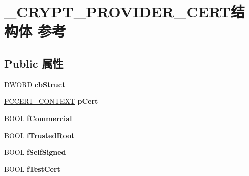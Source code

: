 \hypertarget{struct___c_r_y_p_t___p_r_o_v_i_d_e_r___c_e_r_t}{}\section{\+\_\+\+C\+R\+Y\+P\+T\+\_\+\+P\+R\+O\+V\+I\+D\+E\+R\+\_\+\+C\+E\+R\+T结构体 参考}
\label{struct___c_r_y_p_t___p_r_o_v_i_d_e_r___c_e_r_t}
\subsection*{Public 属性}
\begin{DoxyCompactItemize}
\item 
\mbox{\label{struct___c_r_y_p_t___p_r_o_v_i_d_e_r___c_e_r_t_a60aed42aba62cd61475076a1ea303191}} 
D\+W\+O\+RD {\bfseries cb\+Struct}
\item 
\mbox{\label{struct___c_r_y_p_t___p_r_o_v_i_d_e_r___c_e_r_t_acf58baf163a5c3cfe1f18a1a3cbbef9a}} 
\hyperlink{struct___c_e_r_t___c_o_n_t_e_x_t}{P\+C\+C\+E\+R\+T\+\_\+\+C\+O\+N\+T\+E\+XT} {\bfseries p\+Cert}
\item 
\mbox{\label{struct___c_r_y_p_t___p_r_o_v_i_d_e_r___c_e_r_t_a0a7f995100a233eaf74d9c62ee91eb79}} 
B\+O\+OL {\bfseries f\+Commercial}
\item 
\mbox{\label{struct___c_r_y_p_t___p_r_o_v_i_d_e_r___c_e_r_t_ace464fa433dc5a3e11793ec72405825f}} 
B\+O\+OL {\bfseries f\+Trusted\+Root}
\item 
\mbox{\label{struct___c_r_y_p_t___p_r_o_v_i_d_e_r___c_e_r_t_a6acc00bc12c0b2d3126f856fe11c8e93}} 
B\+O\+OL {\bfseries f\+Self\+Signed}
\item 
\mbox{\label{struct___c_r_y_p_t___p_r_o_v_i_d_e_r___c_e_r_t_ab88a87bf51d603c73920e2541c188fbe}} 
B\+O\+OL {\bfseries f\+Test\+Cert}
\item 
\mbox{\label{struct___c_r_y_p_t___p_r_o_v_i_d_e_r___c_e_r_t_af7aaf3f3516273eb17270b69781f03e9}} 

\end{DoxyCompactItemize}
